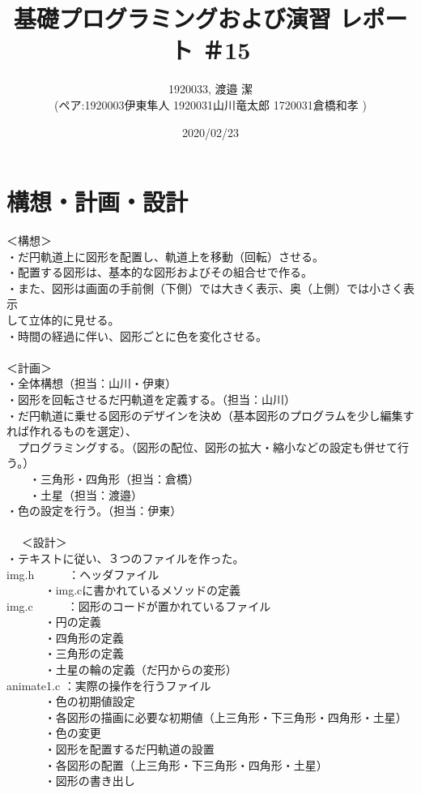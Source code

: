 \documentclass[12pt,a4j]{jarticle}
\begin{document}
\title{基礎プログラミングおよび演習 レポート ＃15}
\author{1920033, 渡邉 潔\\ (ペア:1920003伊東隼人 1920031山川竜太郎 1720031倉橋和孝 ) }
\date{2020/02/23}
\maketitle

\section{構想・計画・設計}
＜構想＞\\
・だ円軌道上に図形を配置し、軌道上を移動（回転）させる。\\
・配置する図形は、基本的な図形およびその組合せで作る。\\
・また、図形は画面の手前側（下側）では大きく表示、奥（上側）では小さく表示\\
  して立体的に見せる。\\
・時間の経過に伴い、図形ごとに色を変化させる。\\
\\
＜計画＞\\
・全体構想（担当：山川・伊東）\\
・図形を回転させるだ円軌道を定義する。（担当：山川）\\
・だ円軌道に乗せる図形のデザインを決め（基本図形のプログラムを少し編集す\\
  れば作れるものを選定）、\\
　プログラミングする。（図形の配位、図形の拡大・縮小などの設定も併せて行う。）\\
　　・三角形・四角形（担当：倉橋）\\
　　・土星（担当：渡邉）\\
・色の設定を行う。（担当：伊東）\\
\\　
＜設計＞\\
・テキストに従い、３つのファイルを作った。\\
img.h　　　：ヘッダファイル\\
　　　 ・img.cに書かれているメソッドの定義\\
img.c　　　：図形のコードが置かれているファイル\\
　　 　・円の定義\\
　　　 ・四角形の定義\\
　　　 ・三角形の定義\\
　　　 ・土星の輪の定義（だ円からの変形）\\
animate1.c ：実際の操作を行うファイル\\
　　 　・色の初期値設定\\
　　　 ・各図形の描画に必要な初期値（上三角形・下三角形・四角形・土星）\\
　　 　・色の変更\\
　　　 ・図形を配置するだ円軌道の設置\\
　　 　・各図形の配置（上三角形・下三角形・四角形・土星）\\
　　　 ・図形の書き出し\\
\end{document}
